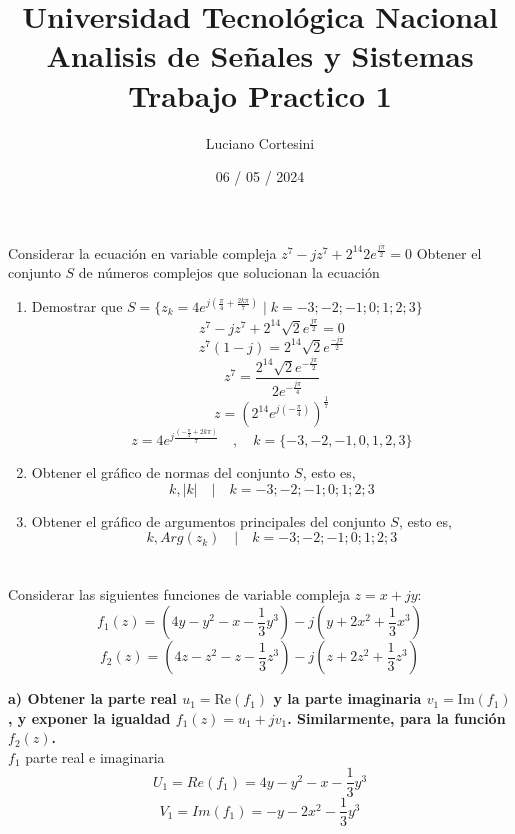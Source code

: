 \documentclass[12pt]{report}
\title{%
  \fontsize{25}{0}\selectfont Universidad Tecnológica Nacional \\
  \fontsize{22}{30}\selectfont Analisis de Señales y Sistemas \\
  \fontsize{20}{25}\selectfont Trabajo Practico 1
}
\author{Luciano Cortesini}
\date{06 / 05 / 2024}
\begin{document}
\maketitle

\chapter{}%
Considerar la ecuación en variable compleja $z^7-jz^7+2^{14}2e^{\frac{j\pi}{2}}=0$
Obtener el conjunto $S$ de números complejos que solucionan la ecuación

\begin{enumerate}
  \item Demostrar que  $S = \{z_k = 4e^{j(\frac{\pi}{4}+\frac{2k\pi}{7})} \mid k=-3;-2;-1;0;1;2;3\}$
    $$z^7 - jz^7 + 2^{14}\sqrt{2}e^{\frac{j\pi}{2}} = 0$$
    $$z^7(1-j) = 2^{14}\sqrt{2}e^{\frac{-j\pi}{2}}$$
    $$z^7 = \frac{2^{14}\sqrt{2}e^{-\frac{j\pi}{2}}} {2e^{-\frac{j\pi}{4}}}$$
    $$z = (2^{14}e^{j(-\frac{\pi} {4})})^{\frac{1}{7}}$$
    $$z = 4e^{j\frac{(-\frac{\pi}{4}+2k\pi)}{7}} \quad,\quad k = \{-3,-2,-1,0,1,2,3\}$$

  \item Obtener el gráfico de normas del conjunto $S$, esto es,
    $$k, |k| \quad | \quad k = -3;-2;-1;0;1;2;3 $$

  \item Obtener el gráfico de argumentos principales del conjunto $S$, esto es,
    $$k, Arg(z_k) \quad | \quad k = -3;-2;-1;0;1;2;3 $$

\end{enumerate}

\chapter{}%
Considerar las siguientes funciones de variable compleja $z = x + jy$:
$$f_1(z) = (4y - y^2 - x - \frac{1}{3}y^3) - j(y + 2x^2 + \frac{1}{3}x^3)$$
$$f_2(z) = (4z - z^2 - z - \frac{1}{3}z^3) - j(z + 2z^2 + \frac{1}{3}z^3)$$

\textbf{a) Obtener la parte real $u_1 = \text{Re}(f_1)$ y la parte imaginaria $v_1 = \text{Im}(f_1)$
, y exponer la igualdad $f_1(z) = u_1 + jv_1$. Similarmente, para la función $f_2(z)$.}\\

$f_1$ parte real e imaginaria
$$U_1=Re(f_1)=4y-y^2-x-\frac{1}{3}y^3$$
$$V_1=Im(f_1)=-y-2x^2-\frac{1}{3}y^3$$
\end{document}
